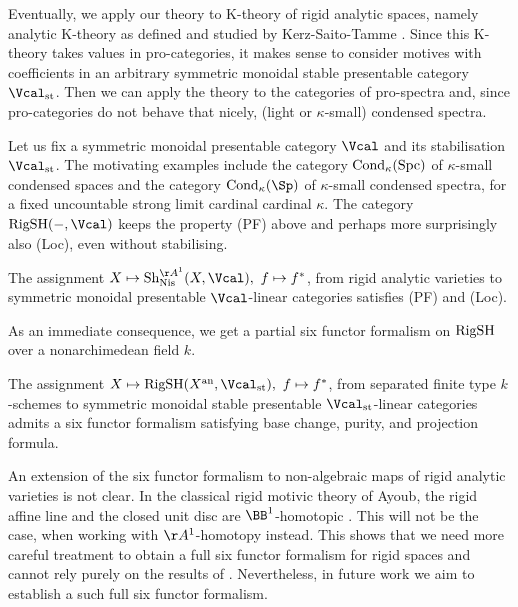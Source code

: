 \documentclass[colorinlistoftodos,article,11pt,reqno]{article}
\newcommand{\RigSH}{\textup{RigSH}}
\newcommand{\Cond}{\textup{Cond}}
\newcommand{\Spc}{\textup{Spc}}
\newcommand{\Sh}{\textup{Sh}}
\newcommand{\Nis}{\textup{Nis}}
\newcommand{\an}{\textup{an}}
\newcommand{\Arig}{\AA^{1}}
\newcommand{\Brig}{\BB^{1}}
\newcommand{\infcat}{category}
\begin{document}
\vspace{6pt}\noindent 
Eventually, we apply our theory to K-theory of rigid analytic spaces, namely analytic K-theory as defined and studied by Kerz-Saito-Tamme \cite{kst-i,kst-ii}. Since this K-theory takes values in pro-categories, it makes sense to consider motives with coefficients in an arbitrary symmetric monoidal stable presentable \infcat{} $\Vcal_{\textup{st}}$. Then we can apply the theory to the categories of pro-spectra and, since pro-categories do not behave that nicely, (light or $\kappa$-small) condensed spectra.

Let us fix a symmetric monoidal presentable category $\Vcal$ and its stabilisation $\Vcal_{\textup{st}}$. The motivating examples include the category $\Cond_{\kappa}(\Spc)$ of $\kappa$-small condensed spaces and the category $\Cond_{\kappa}(\Sp)$ of $\kappa$-small condensed spectra, for a fixed uncountable strong limit cardinal cardinal $\kappa$. The category $\RigSH(-,\Vcal)$ keeps the property (PF) above and perhaps more surprisingly also (Loc), even without stabilising. 

\begin{intro-theorem}[\protect{\ref{prop-smooth-BC-and-PF},~\ref{thm-gluing}}]
The assignment $X\mapsto \Sh^{\Arig}_{\Nis}(X,\Vcal),\ f\mapsto f^{*}$, from rigid analytic varieties to symmetric monoidal presentable $\Vcal$-linear categories satisfies (PF) and (Loc). 
\end{intro-theorem}

As an immediate consequence, we get a partial six functor formalism on $\RigSH$ over a nonarchimedean field $k$.

\begin{intro-corollary}[\protect{\ref{thm-6ff}}]
   The assignment $X\mapsto \RigSH(X^{\an},\Vcal_{\textup{st}}),\ f\mapsto f^{*}$, from separated finite type $k$-schemes to symmetric monoidal stable presentable $\Vcal_{\textup{st}}$-linear categories admits a six functor formalism satisfying base change, purity, and projection formula.
\end{intro-corollary}

An extension of the six functor formalism to non-algebraic maps of rigid analytic varieties is not clear. In the classical rigid motivic theory of Ayoub, the rigid affine line and the closed unit disc are $\Brig$-homotopic \cite[Prop. 1.3.4]{AyoubRig}. This will not be the case, when working with $\Arig$-homotopy instead. This shows that we need more careful treatment to obtain a full six functor formalism for rigid spaces and cannot rely purely on the results of \cite{AGV}. Nevertheless, in future work we aim to establish a such full six functor formalism.
\end{document}
